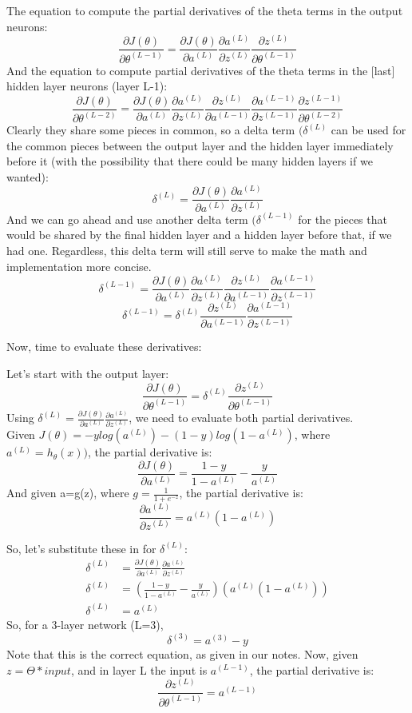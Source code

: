 The equation to compute the partial derivatives of the theta terms in the output neurons:
\[
\frac{\partial J(\theta)}{\partial \theta^{(L-1)}} = \frac{\partial J(\theta)}{\partial a^{(L)}} \frac{\partial a^{(L)}}{\partial z^{(L)}} \frac{\partial z^{(L)}}{\partial \theta^{(L-1)}} 
\]
And the equation to compute partial derivatives of the theta terms in the [last] hidden layer neurons (layer L-1):
\[\frac{\partial J(\theta)}{\partial \theta^{(L-2)}} = \frac{\partial J(\theta)}{\partial a^{(L)}} \frac{\partial a^{(L)}}{\partial z^{(L)}} \frac{\partial z^{(L)}}{\partial a^{(L-1)}} \frac{\partial a^{(L-1)}}{\partial z^{(L-1)}} \frac{\partial z^{(L-1)}}{\partial \theta^{(L-2)}} 
\]
Clearly they share some pieces in common, so a delta term $(\delta^{(L)}$ can be used for the common pieces between the output layer and the hidden layer immediately before it (with the possibility that there could be many hidden layers if we wanted):
\[\delta^{(L)} = \frac{\partial J(\theta)}{\partial a^{(L)}} \frac{\partial a^{(L)}}{\partial z^{(L)}}\]
And we can go ahead and use another delta term $(\delta^{(L-1)}$ for the pieces that would be shared by the final hidden layer and a hidden layer before that, if we had one. Regardless, this delta term will still serve to make the math and implementation more concise.
\[
\delta^{(L-1)} = \frac{\partial J(\theta)}{\partial a^{(L)}} \frac{\partial a^{(L)}}{\partial z^{(L)}} \frac{\partial z^{(L)}}{\partial a^{(L-1)}} \frac{\partial a^{(L-1)}}{\partial z^{(L-1)}}
\]
\[
\delta^{(L-1)} = \delta^{(L)} \frac{\partial z^{(L)}}{\partial a^{(L-1)}} \frac{\partial a^{(L-1)}}{\partial z^{(L-1)}}
\]

Now, time to evaluate these derivatives:

Let's start with the output layer:
\[
\frac{\partial J(\theta)}{\partial \theta^{(L-1)}} = \delta^{(L)} \frac{\partial z^{(L)}}{\partial \theta^{(L-1)}} 
\]
Using $\delta^{(L)} = \frac{\partial J(\theta)}{\partial a^{(L)}} \frac{\partial a^{(L)}}{\partial z^{(L)}}$, we need to evaluate both partial derivatives.\\
Given $J(\theta) = -ylog(a^{(L)}) - (1-y)log(1-a^{(L)})$, where $a^{(L)} = h_{\theta}(x))$, the partial derivative is:
\[
\frac{\partial J(\theta)}{\partial a^{(L)}} = \frac{1-y}{1-a^{(L)}} - \frac{y}{a^{(L)}}
\]
And given a=g(z), where $g = \frac{1}{1+e^{-z}}$, the partial derivative is:
\[
\frac{\partial a^{(L)}}{\partial z^{(L)}} = a^{(L)}(1-a^{(L)}) 
\]

So, let's substitute these in for $\delta^{(L)}$:
\begin{align*}
\delta^{(L)} &= \frac{\partial J(\theta)}{\partial a^{(L)}} \frac{\partial a^{(L)}}{\partial z^{(L)}} \\
\delta^{(L)} &= (\frac{1-y}{1-a^{(L)}} - \frac{y}{a^{(L)}}) (a^{(L)}(1-a^{(L)})) \\
\delta^{(L)} &=a^{(L)}
\end{align*}
So, for a 3-layer network (L=3),
\[
\delta^{(3)} =a^{(3)} - y
\]
Note that this is the correct equation, as given in our notes.
Now, given $z=\Theta*input$, and in layer L the input is $a^{(L-1)}$, the partial derivative is:
\[
\frac{\partial z^{(L)}}{\partial \theta^{(L-1)}} = a^{(L-1)} 
\]
